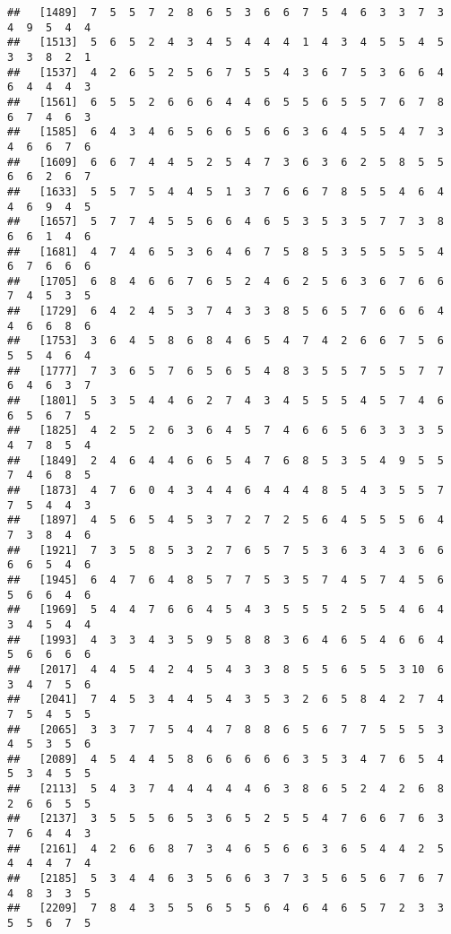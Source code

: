 \documentclass[
]{book}
\begin{document}
\begin{verbatim}
##   [1489]  7  5  5  7  2  8  6  5  3  6  6  7  5  4  6  3  3  7  3  4  9  5  4  4
##   [1513]  5  6  5  2  4  3  4  5  4  4  4  1  4  3  4  5  5  4  5  3  3  8  2  1
##   [1537]  4  2  6  5  2  5  6  7  5  5  4  3  6  7  5  3  6  6  4  6  4  4  4  3
##   [1561]  6  5  5  2  6  6  6  4  4  6  5  5  6  5  5  7  6  7  8  6  7  4  6  3
##   [1585]  6  4  3  4  6  5  6  6  5  6  6  3  6  4  5  5  4  7  3  4  6  6  7  6
##   [1609]  6  6  7  4  4  5  2  5  4  7  3  6  3  6  2  5  8  5  5  6  6  2  6  7
##   [1633]  5  5  7  5  4  4  5  1  3  7  6  6  7  8  5  5  4  6  4  4  6  9  4  5
##   [1657]  5  7  7  4  5  5  6  6  4  6  5  3  5  3  5  7  7  3  8  6  6  1  4  6
##   [1681]  4  7  4  6  5  3  6  4  6  7  5  8  5  3  5  5  5  5  4  6  7  6  6  6
##   [1705]  6  8  4  6  6  7  6  5  2  4  6  2  5  6  3  6  7  6  6  7  4  5  3  5
##   [1729]  6  4  2  4  5  3  7  4  3  3  8  5  6  5  7  6  6  6  4  4  6  6  8  6
##   [1753]  3  6  4  5  8  6  8  4  6  5  4  7  4  2  6  6  7  5  6  5  5  4  6  4
##   [1777]  7  3  6  5  7  6  5  6  5  4  8  3  5  5  7  5  5  7  7  6  4  6  3  7
##   [1801]  5  3  5  4  4  6  2  7  4  3  4  5  5  5  4  5  7  4  6  6  5  6  7  5
##   [1825]  4  2  5  2  6  3  6  4  5  7  4  6  6  5  6  3  3  3  5  4  7  8  5  4
##   [1849]  2  4  6  4  4  6  6  5  4  7  6  8  5  3  5  4  9  5  5  7  4  6  8  5
##   [1873]  4  7  6  0  4  3  4  4  6  4  4  4  8  5  4  3  5  5  7  7  5  4  4  3
##   [1897]  4  5  6  5  4  5  3  7  2  7  2  5  6  4  5  5  5  6  4  7  3  8  4  6
##   [1921]  7  3  5  8  5  3  2  7  6  5  7  5  3  6  3  4  3  6  6  6  6  5  4  6
##   [1945]  6  4  7  6  4  8  5  7  7  5  3  5  7  4  5  7  4  5  6  5  6  6  4  6
##   [1969]  5  4  4  7  6  6  4  5  4  3  5  5  5  2  5  5  4  6  4  3  4  5  4  4
##   [1993]  4  3  3  4  3  5  9  5  8  8  3  6  4  6  5  4  6  6  4  5  6  6  6  6
##   [2017]  4  4  5  4  2  4  5  4  3  3  8  5  5  6  5  5  3 10  6  3  4  7  5  6
##   [2041]  7  4  5  3  4  4  5  4  3  5  3  2  6  5  8  4  2  7  4  7  5  4  5  5
##   [2065]  3  3  7  7  5  4  4  7  8  8  6  5  6  7  7  5  5  5  3  4  5  3  5  6
##   [2089]  4  5  4  4  5  8  6  6  6  6  6  3  5  3  4  7  6  5  4  5  3  4  5  5
##   [2113]  5  4  3  7  4  4  4  4  4  6  3  8  6  5  2  4  2  6  8  2  6  6  5  5
##   [2137]  3  5  5  5  6  5  3  6  5  2  5  5  4  7  6  6  7  6  3  7  6  4  4  3
##   [2161]  4  2  6  6  8  7  3  4  6  5  6  6  3  6  5  4  4  2  5  4  4  4  7  4
##   [2185]  5  3  4  4  6  3  5  6  6  3  7  3  5  6  5  6  7  6  7  4  8  3  3  5
##   [2209]  7  8  4  3  5  5  6  5  5  6  4  6  4  6  5  7  2  3  3  5  5  6  7  5

\end{verbatim}
\end{document}
